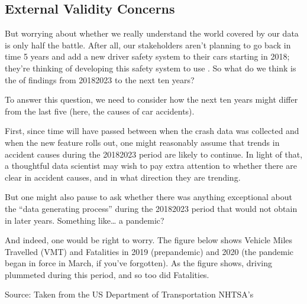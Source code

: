 \documentclass[letterpaper,10pt,english]{jupyterBook}
\begin{document}
\subsection{External Validity Concerns}
\label{\detokenize{30_questions/15_answering_exploratory_questions:external-validity-concerns}}
\sphinxAtStartPar
But worrying about whether we really understand the world covered by our data is only half the battle. After all, our stakeholders aren’t planning to go back in time 5 years and add a new driver safety system to their cars starting in 2018; they’re thinking of developing this safety system to use . So what do we think is the  of findings from 2018\sphinxhyphen{}2023 to the next ten years?

\sphinxAtStartPar
To answer this question, we need to consider how the next ten years might differ from the last five  (here, the causes of car accidents).

\sphinxAtStartPar
First, since time will have passed between when the crash data was collected and when the new feature rolls out, one might reasonably assume that trends in accident causes during the 2018\sphinxhyphen{}2023 period are likely to continue. In light of that, a thoughtful data scientist may wish to pay extra attention to whether there are clear  in accident causes, and in what direction they are trending.

\sphinxAtStartPar
But one might also pause to ask whether there was anything exceptional about the “data generating process” during the 2018\sphinxhyphen{}2023 period that would not obtain in later years. Something like… a pandemic?

\sphinxAtStartPar
And indeed, one would be right to worry. The figure below shows Vehicle Miles Travelled (VMT) and Fatalities in 2019 (pre\sphinxhyphen{}pandemic) and 2020 (the pandemic began in force in March, if you’ve forgotten). As the figure shows, driving plummeted during this period, and so too did Fatalities.

\sphinxAtStartPar
{}

\sphinxAtStartPar
Source: Taken from the US Department of Transportation NHTSA’s 
\end{document}
